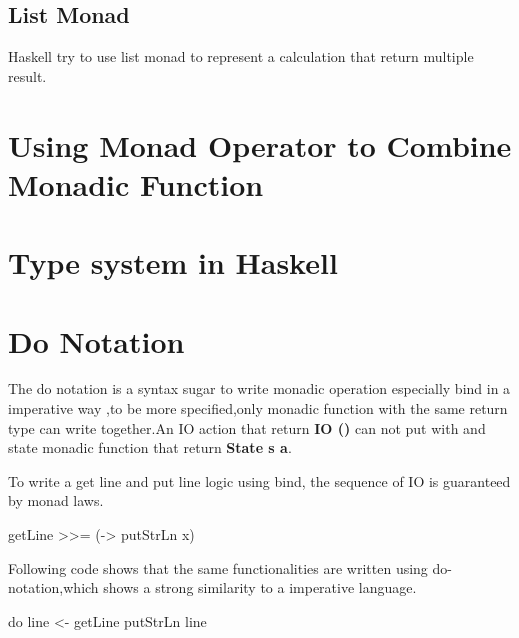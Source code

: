 \subsection{List Monad}
Haskell try to use list monad to represent a calculation that return multiple result.


\section{Using Monad Operator to Combine Monadic Function}

\section{Type system in Haskell}
\section{Do Notation }
The do notation is a syntax sugar to write monadic operation especially bind in a imperative way ,to be more specified,only monadic function with the same return type can write together.An IO action that return \textbf{IO ()} can not put with and state monadic function that return \textbf{State s a}.

To write a get line and put line logic using bind, the sequence of IO is guaranteed by monad laws.
\begin{hcode}
 getLine >>= (\x -> putStrLn x)
\end{hcode}


Following code shows that the same functionalities are written using do-notation,which shows a strong similarity to a imperative language.
\begin{hcode}
do line <- getLine 
   putStrLn line
\end{hcode}


